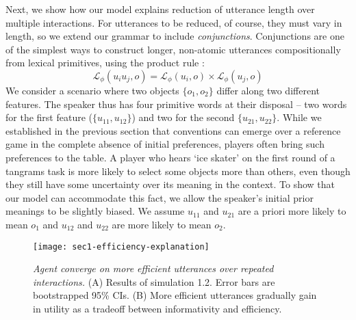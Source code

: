 Next, we show how our model explains reduction of utterance length over multiple interactions. 
For utterances to be reduced, of course, they must vary in length, so we extend our grammar to include \emph{conjunctions}. 
Conjunctions are one of the simplest ways to construct longer, non-atomic utterances compositionally from lexical primitives, using the product rule \cite<see also>[who instead consider negation]{SteinertThrelkeld16_CompositionalSignaling}:
$$\mathcal{L}_\phi(u_iu_j, o) = \mathcal{L}_\phi(u_i, o) \times \mathcal{L}_\phi(u_j, o)$$
We consider a scenario where two objects $\{o_1, o_2\}$ differ along two different features. 
The speaker thus has four primitive words at their disposal -- two words for the first feature ($\{u_{11}, u_{12}\}$) and two for the second $\{u_{21}, u_{22}\}$. 
While we established in the previous section that conventions can emerge over a reference game in the complete absence of initial preferences, players often bring such preferences to the table. 
A player who hears `ice skater' on the first round of a tangrams task is more likely to select some objects more than others, even though they still have some uncertainty over its meaning in the context. 
To show that our model can accommodate this fact, we allow the speaker's initial prior meanings to be slightly biased. 
We assume $u_{11}$ and $u_{21}$ are a priori more likely to mean $o_1$ and $u_{12}$ and $u_{22}$ are more likely to mean $o_2$.

\begin{figure}
\centering
    \texttt{[image: sec1-efficiency-explanation]}
  \caption{\emph{Agent converge on more efficient utterances over repeated interactions.} (A) Results of simulation 1.2. Error bars are bootstrapped 95\% CIs. (B) More efficient utterances gradually gain in utility as a tradeoff between informativity and efficiency.}
  \label{fig:sec1efficiency}
\end{figure}


